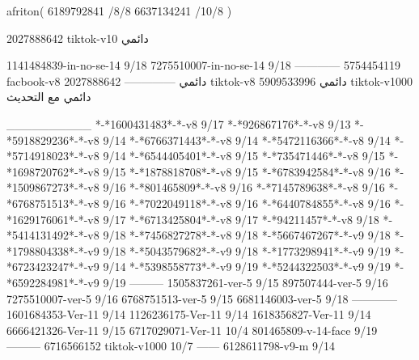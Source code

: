 afriton(
6189792841 /8/8
6637134241 /10/8
)

2027888642 tiktok-v10
دائمي



1141484839-in-no-se-14 9/18
7275510007-in-no-se-14 9/18
------------
5754454119 facbook-v8
دائمي
--------------
2027888642 tiktok-v8
دائمي
5909533996 tiktok-v1000
دائمي مع التحديث

__________
*-*1600431483*-*-v8 9/17
*-*926867176*-*-v8 9/13
*-*5918829236*-*-v8 9/14
*-*6766371443*-*-v8 9/14
*-*5472116366*-*-v8 9/14
*-*5714918023*-*-v8 9/14
*-*6544405401*-*-v8 9/15
*-*735471446*-*-v8 9/15
*-*1698720762*-*-v8 9/15
*-*1878818708*-*-v8 9/15
*-*6783942584*-*-v8 9/16
*-*1509867273*-*-v8 9/16
*-*801465809*-*-v8 9/16
*-*7145789638*-*-v8 9/16
*-*6768751513*-*-v8 9/16
*-*7022049118*-*-v8 9/16
*-*6440784855*-*-v8 9/16
*-*1629176061*-*-v8 9/17
*-*6713425804*-*-v8 9/17
*-*94211457*-*-v8 9/18
*-*5414131492*-*-v8 9/18
*-*7456827278*-*-v8 9/18
*-*5667467267*-*-v9 9/18
*-*1798804338*-*-v9 9/18
*-*5043579682*-*-v9 9/18
*-*1773298941*-*-v9 9/19
*-*6723423247*-*-v9 9/14
*-*5398558773*-*-v9 9/19
*-*5244322503*-*-v9 9/19
*-*6592284981*-*-v9 9/19
---------
1505837261-ver-5 9/15
897507444-ver-5 9/16
7275510007-ver-5 9/16
6768751513-ver-5 9/15
6681146003-ver-5 9/18
------------
1601684353-Ver-11
9/14
1126236175-Ver-11
9/14
1618356827-Ver-11
9/14
6666421326-Ver-11
9/15
6717029071-Ver-11
10/4
801465809-v-14-face 9/19
---------
6716566152 tiktok-v1000
10/7
------
6128611798-v9-m
9/14
